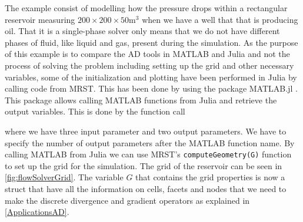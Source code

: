 The example consist of modelling how the pressure drops within a rectangular reservoir measuring $200\times 200 \times 50 \text{m}^3$ when we have a well that that is producing oil. That it is a single-phase solver only means that we do not have different phases of fluid, like liquid and gas, present during the simulation. As the purpose of this example is to compare the AD tools in MATLAB and Julia and not the process of solving the problem including setting up the grid and other necessary variables, some of the initialization and plotting have been performed in Julia by calling code from MRST. This has been done by using the package MATLAB.jl \emph{\citep{MATLAB.jl}}. This package allows calling MATLAB functions from Julia and retrieve the output variables. This is done by the function call

where we have three input parameter and two output parameters. We have to specify the number of output parameters after the MATLAB function name.  By calling MATLAB from Julia we can use MRST's \texttt{computeGeometry(G)} function to set up the grid for the simulation. The grid of the reservoir can be seen in \autoref{fig:flowSolverGrid}. The variable $G$ that contains the grid properties is now a struct that have all the information on cells, facets and nodes that we need to make the discrete divergence and gradient operators as explained in \autoref{ApplicationsAD}. 

